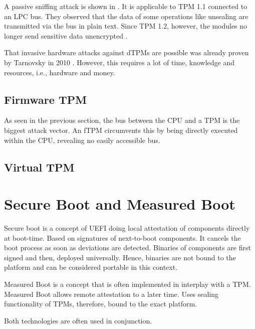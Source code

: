 A passive sniffing attack is shown in \cite{Kursawe2005AnalyzingTP}. It is applicable to TPM 1.1 connected to an LPC bus. They observed that the data of some operations like unsealing are transmitted via the bus in plain text. Since TPM 1.2, however, the modules no longer send sensitive data unencrypted \cite{Winter2013}.

That invasive hardware attacks against dTPMs are possible was already proven by Tarnovsky in 2010 \cite{tarnovsky}. However, this requires a lot of time, knowledge and resources, i.e., hardware and money.


\subsection{Firmware TPM}

As seen in the previous section, the bus between the CPU and a TPM is the biggest attack vector. An fTPM circumvents this by being directly executed within the CPU, revealing no easily accessible bus.

\subsection{Virtual TPM}




\section{Secure Boot and Measured Boot}

Secure boot is a concept of UEFI doing local attestation of components directly at boot-time. Based on signatures of next-to-boot components. It cancels the boot process as soon as deviations are detected. Binaries of components are first signed and then, deployed universally. Hence, binaries are not bound to the platform and can be considered portable in this context.

Measured Boot is a concept that is often implemented in interplay with a TPM. Measured Boot allows remote attestation to a later time. Uses sealing functionality of TPMs, therefore, bound to the exact platform.

Both technologies are often used in conjunction.
